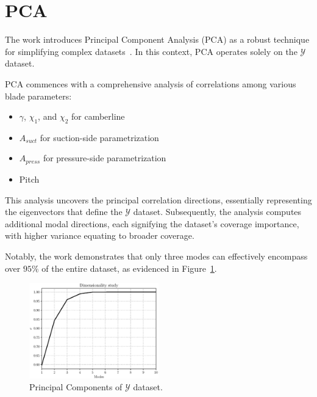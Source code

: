 \documentclass[11pt,a4paper,twocolumn]{article}
\begin{document}
\section{PCA}


The work introduces Principal Component Analysis (PCA) as a robust technique for simplifying complex datasets~\cite{geron2022hands}. In this context, PCA operates solely on the $\mathcal{Y}$ dataset.

PCA commences with a comprehensive analysis of correlations among various blade parameters:

\begin{itemize} 
    \item $\gamma$, $\chi_1$, and $\chi_2$ for camberline
    \item $A_{suct}$ for suction-side parametrization
    \item $A_{press}$ for pressure-side parametrization
    \item Pitch
\end{itemize}


This analysis uncovers the principal correlation directions, essentially representing the eigenvectors that define the $\mathcal{Y}$ dataset. Subsequently, the analysis computes additional modal directions, each signifying the dataset's coverage importance, with higher variance equating to broader coverage.

Notably, the work demonstrates that only three modes can effectively encompass over $95\%$ of the entire dataset, as evidenced in Figure~\ref{fig:PCA}.

\begin{figure}[!h]
    \centering
    \includegraphics[width=0.5\textwidth]{./images/PCAmodes.eps}
    \caption{Principal Components of $\mathcal{Y}$ dataset.}
    \label{fig:PCA}
\end{figure}
\end{document}
